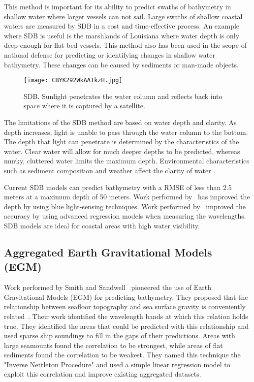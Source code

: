 \par
This method is important for its ability to predict swaths of bathymetry in shallow water where larger vessels can not sail.
Large swaths of shallow coastal waters are measured by \ac{SDB} in a cost and time-effective process.
An example where \ac{SDB} is useful is the marshlands of Louisiana where water depth is only deep enough for flat-bed vessels.
This method also has been used in the scope of national defense for predicting or identifying changes in shallow water bathymetry.
These changes can be caused by sediments or man-made objects. 

\begin{figure}[htp]
    \centering
    \texttt{[image: CBYK292WkAAIkzH.jpg]}
    \caption{\ac{SDB}.
    Sunlight penetrates the water column and reflects back into space where it is captured by a satellite.}
    \label{fig:sdb}
\end{figure}

\par
The limitations of the \ac{SDB} method are based on water depth and clarity.
As depth increases, light is unable to pass through the water column to the bottom.
The depth that light can penetrate is determined by the characteristics of the water.
Clear water will allow for much deeper depths to be predicted, whereas murky, cluttered water limits the maximum depth.
Environmental characteristics such as sediment composition and weather affect the clarity of water \cite{vinayaraj2016satellite}.

\par
Current \ac{SDB} models can predict bathymetry with a \ac{RMSE} of less than 2.5 meters at a maximum depth of 50 meters.
Work performed by~\cite{vinayaraj2016satellite} has improved the depth by using blue light-sensing techniques.
Work performed by~\cite{chybicki2018three} improved the accuracy by using advanced regression models when measuring the wavelengths.
\ac{SDB} models are ideal for coastal areas with high water visibility.

\subsection{Aggregated Earth Gravitational Models (EGM)}
Work performed by Smith and Sandwell~\cite{smith1994bathymetric,smith1997global} pioneered the use of Earth Gravitational Models (EGM) for predicting bathymetry.
They proposed that the relationship between seafloor topography and sea surface gravity is conveniently related~\cite{smith1994bathymetric}.
Their work identified the wavelength bands at which this relation holds true.
They identified the areas that could be predicted with this relationship and used sparse ship soundings to fill in the gaps of their predictions.
Areas with large seamounts found the correlation to be strongest, while areas of flat sediments found the correlation to be weakest.
They named this technique the "Inverse Nettleton Procedure" and used a simple linear regression model to exploit this correlation and improve existing aggregated datasets.


